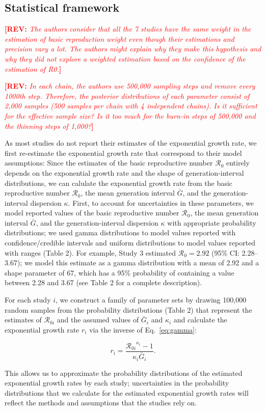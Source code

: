 \documentclass[12pt]{article}
\newcommand{\eref}[1]{Eq.~\ref{eq:#1}}
\newcommand{\Rx}[1]{\ensuremath{{\mathcal R}_{#1}}\xspace}
\newcommand{\Ro}{\ensuremath{{\mathcal R}_{0}}\xspace}
\newcommand{\comment}[3]{\textcolor{#1}{\textbf{[#2: }\textsl{#3}\textbf{]}}}
\newcommand{\rev}[1]{\comment{red}{REV}{#1}}
\begin{document}
\subsection{Statistical framework}

\rev{The authors consider that all the 7 studies have the same weight in the estimation of basic
reproduction weight even though their estimations and precision vary a lot. The authors might
explain why they make this hypothesis and why they did not explore a weighted estimation
based on the confidence of the estimation of R0.}

\rev{In each chain, the authors use 500,000 sampling steps and remove every 1000th step.
Therefore, the posterior distributions of each parameter consist of 2,000 samples (500 samples
per chain with 4 independent chains). Is it sufficient for the effective sample size? Is it too much
for the burn-in steps of 500,000 and the thinning steps of 1,000?}

As most studies do not report their estimates of the exponential growth rate, we first re-estimate the exponential growth rate that correspond to their model assumptions:
Since the estimates of the basic reproductive number \Ro entirely depends on the exponential growth rate and the shape of generation-interval distributions, we can calulate the exponential growth rate from the basic reproductive number \Ro, the mean generation interval $\bar G$, and the generation-interval dispersion $\kappa$.
First, to account for uncertainties in these parameters, we model reported values of the basic reproductive number \Ro, the mean generation interval $\bar G$, and the generation-interval dispersion $\kappa$ with appropriate probability distributions;
we used gamma distributions to model values reported with confidence/credible intervals and uniform distributions to model values reported with ranges (Table 2).
For example, Study 3 estimated $\Ro = 2.92$ (95\% CI: 2.28--3.67);
we model this estimate as a gamma distribution with a mean of 2.92 and a shape parameter of 67, which has a 95\% probability of containing a value between 2.28 and 3.67 (see Table 2 for a complete description).

For each study $i$, we construct a family of parameter sets by drawing 100,000 random samples from the probability distributions (Table 2) that represent the estimates of \Rx{0i} and the assumed values of $\bar G_i$ and $\kappa_i$ and calculate the exponential growth rate $r_i$ via the inverse of \eref{gamma}:
\begin{linenomath*}
\begin{equation}
r_i = \frac{\Rx{0i}^{\kappa_i} - 1}{\kappa_i \bar{G}_i}.
\end{equation}
\end{linenomath*}
This allows us to approximate the probability distributions of the estimated exponential growth rates by each study;
uncertainties in the probability distributions that we calculate for the estimated exponential growth rates will reflect the methods and assumptions that the studies rely on.
\end{document}
